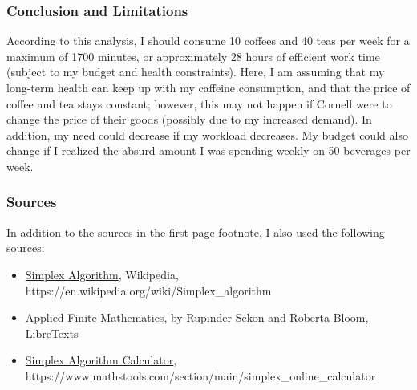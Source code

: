 \documentclass[letterpaper,11pt]{article}
\begin{document}
\subsubsection*{Conclusion and Limitations}

\noindent According to this analysis, I should consume 10 coffees and 40 teas per week for a maximum of \num[group-separator={,}]{1700} minutes, or approximately 28 hours of efficient work time (subject to my budget and health constraints). Here, I am assuming that my long-term health can keep up with my caffeine consumption, and that the price of coffee and tea stays constant; however, this may not happen if Cornell were to change the price of their goods (possibly due to my increased demand). In addition, my need could decrease if my workload decreases. My budget could also change if I realized the absurd amount I was spending weekly on 50 beverages per week.

\subsubsection*{Sources}
\noindent In addition to the sources in the first page footnote, I also used the following sources:
\begin{itemize}
\item \href{https://en.wikipedia.org/wiki/Simplex\_algorithm}{Simplex Algorithm}, Wikipedia, https://en.wikipedia.org/wiki/Simplex\_algorithm
\item \href{https://math.libretexts.org/Bookshelves/Applied\_Mathematics/Applied\_Finite\_Mathematics\_(Sekhon\_and\_Bloom)/04\%3A\_Linear\_Programming\_The\_Simplex\_Method/4.02\%3A\_Maximization\_By\_The\_Simplex\_Method}{Applied Finite Mathematics}, by Rupinder Sekon and Roberta Bloom, LibreTexts
\item \href{https://www.mathstools.com/section/main/simplex\_online\_calculator}{Simplex Algorithm Calculator}, https://www.mathstools.com/section/main/simplex\_online\_calculator
\end{itemize}
\end{document}
